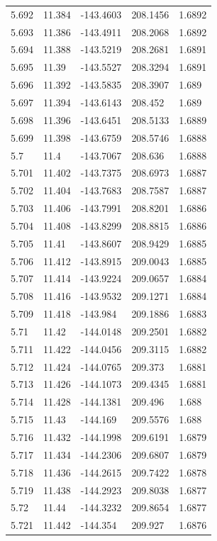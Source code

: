 \begin{tabular}{lllll}
5.692 & 11.384 & -143.4603 & 208.1456 & 1.6892 \\
5.693 & 11.386 & -143.4911 & 208.2068 & 1.6892 \\
5.694 & 11.388 & -143.5219 & 208.2681 & 1.6891 \\
5.695 & 11.39 & -143.5527 & 208.3294 & 1.6891 \\
5.696 & 11.392 & -143.5835 & 208.3907 & 1.689 \\
5.697 & 11.394 & -143.6143 & 208.452 & 1.689 \\
5.698 & 11.396 & -143.6451 & 208.5133 & 1.6889 \\
5.699 & 11.398 & -143.6759 & 208.5746 & 1.6888 \\
5.7 & 11.4 & -143.7067 & 208.636 & 1.6888 \\
5.701 & 11.402 & -143.7375 & 208.6973 & 1.6887 \\
5.702 & 11.404 & -143.7683 & 208.7587 & 1.6887 \\
5.703 & 11.406 & -143.7991 & 208.8201 & 1.6886 \\
5.704 & 11.408 & -143.8299 & 208.8815 & 1.6886 \\
5.705 & 11.41 & -143.8607 & 208.9429 & 1.6885 \\
5.706 & 11.412 & -143.8915 & 209.0043 & 1.6885 \\
5.707 & 11.414 & -143.9224 & 209.0657 & 1.6884 \\
5.708 & 11.416 & -143.9532 & 209.1271 & 1.6884 \\
5.709 & 11.418 & -143.984 & 209.1886 & 1.6883 \\
5.71 & 11.42 & -144.0148 & 209.2501 & 1.6882 \\
5.711 & 11.422 & -144.0456 & 209.3115 & 1.6882 \\
5.712 & 11.424 & -144.0765 & 209.373 & 1.6881 \\
5.713 & 11.426 & -144.1073 & 209.4345 & 1.6881 \\
5.714 & 11.428 & -144.1381 & 209.496 & 1.688 \\
5.715 & 11.43 & -144.169 & 209.5576 & 1.688 \\
5.716 & 11.432 & -144.1998 & 209.6191 & 1.6879 \\
5.717 & 11.434 & -144.2306 & 209.6807 & 1.6879 \\
5.718 & 11.436 & -144.2615 & 209.7422 & 1.6878 \\
5.719 & 11.438 & -144.2923 & 209.8038 & 1.6877 \\
5.72 & 11.44 & -144.3232 & 209.8654 & 1.6877 \\
5.721 & 11.442 & -144.354 & 209.927 & 1.6876 \\

\end{tabular}
